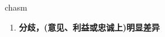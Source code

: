 
\begin{frame}
{\huge chasm}
\begin{center}
\begin{enumerate}\Large
  \item \textbf{分歧，(意见、利益或忠诚上)明显差异}
\end{enumerate}
\end{center}
\end{frame}
